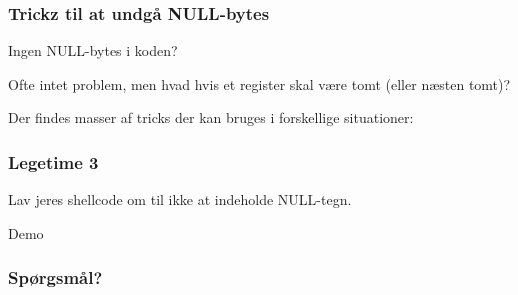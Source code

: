 \documentclass[slidestop,compress,mathserif, xcolor=table]{beamer}
\begin{document}
\begin{frame}[c]
  \frametitle{Trickz til at undgå NULL-bytes}

    \pause Ingen NULL-bytes i koden? \vskip10pt

    \pause Ofte intet problem, men hvad hvis et register skal være tomt (eller
    næsten tomt)? \vskip10pt

    \pause Der findes masser af tricks der kan bruges i forskellige situationer:

    \pause

\end{frame}

\begin{frame}[c]
    \frametitle{Legetime 3}

    Lav jeres shellcode om til ikke at indeholde NULL-tegn.
\end{frame}

\begin{frame}[c]
    \begin{center}
      \Huge Demo
    \end{center}
\end{frame}

\begin{frame}[c]
  \frametitle{Spørgsmål?}
\end{frame}
\end{document}
